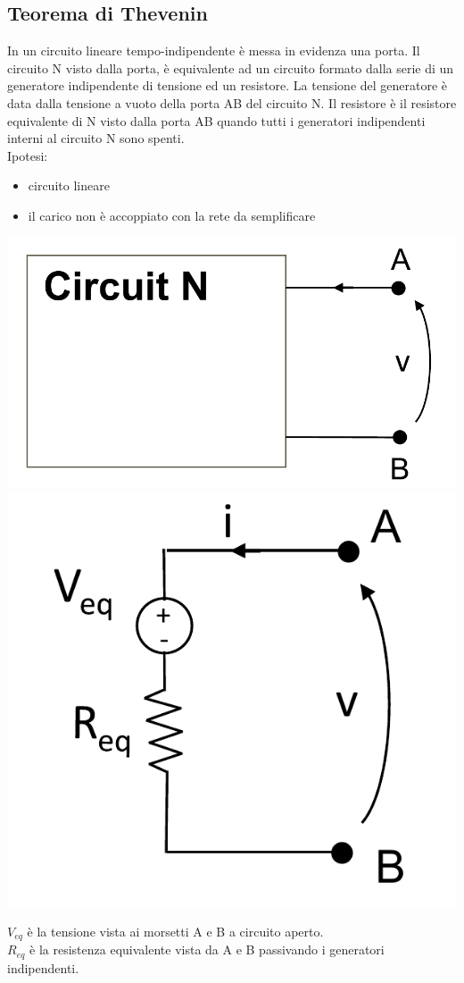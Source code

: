 \documentclass{article}
\begin{document}
\subsection{Teorema di Thevenin}
In un circuito lineare tempo-indipendente è messa in evidenza una porta. Il circuito N visto dalla porta, è equivalente ad un circuito formato dalla serie di un generatore indipendente di tensione ed un resistore. La tensione del generatore è data dalla tensione a vuoto
della porta AB del circuito N. Il resistore è il resistore equivalente di N visto dalla porta AB quando tutti i generatori indipendenti interni al circuito N sono spenti.
\vspace*{0.2cm}\\
Ipotesi:
\begin{itemize}
    \item circuito lineare
    \item il carico non è accoppiato con la rete da semplificare
\end{itemize}
\begin{center}
    \includegraphics[scale=0.3]{Image/Thevenin_1.png}
    \includegraphics[scale=0.3]{Image/Thevenin_2.png}
\end{center}
$V_{eq}$ è la tensione vista ai morsetti A e B a circuito aperto.\\
$R_{eq}$ è la resistenza equivalente vista da A e B passivando i generatori indipendenti.
\end{document}
